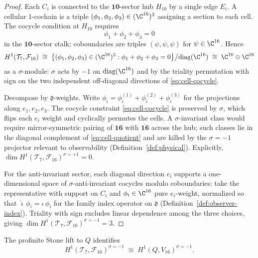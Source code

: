 \begin{proof}
Each $C_i$ is connected to the $\mathbf{10}$-sector hub $H_{10}$ by a single
edge $E_i$. A cellular $1$-cochain is a triple
$(\phi_1,\phi_2,\phi_3)\in(\C^{16})^3$ assigning a section to each cell. The
cocycle condition at $H_{10}$ requires
\begin{equation}\label{eq:cell-cocycle}
  \phi_1+\phi_2+\phi_3=0
\end{equation}
in the $\mathbf{10}$-sector stalk; coboundaries are triples
$(\psi,\psi,\psi)$ for $\psi\in\C^{16}$. Hence
\begin{equation}\label{eq:cell-quotient}
  H^1(\mathcal{T}_7,\mathcal{F}_{16})
  \;\cong\;
  \bigl\{(\phi_1,\phi_2,\phi_3)\in(\C^{16})^3:\phi_1+\phi_2+\phi_3=0\bigr\}
  \big/\mathrm{diag}(\C^{16})
  \;\cong\;
  \C^{16}\oplus\C^{16}
\end{equation}
as a $\sigma$-module: $\sigma$ acts by $-1$ on $\mathrm{diag}(\C^{16})$ and
by the triality permutation with sign on the two independent off-diagonal
directions of \eqref{eq:cell-cocycle}.

Decompose by $\mathfrak{d}$-weights. Write
$\phi_i=\phi_i^{(1)}+\phi_i^{(2)}+\phi_i^{(3)}$ for the projections along
$e_1,e_2,e_3$. The cocycle constraint \eqref{eq:cell-cocycle} is preserved by
$\sigma$, which flips each $e_i$ weight and cyclically permutes the cells.
A $\sigma$-invariant class would require mirror-symmetric pairing of
$\mathbf{16}$ with $\overline{\mathbf{16}}$ across the hub; such classes lie in
the diagonal complement of \eqref{eq:cell-quotient} and are killed by the
$\sigma=-1$ projector relevant to observability
(Definition~\ref{def:physical}). Explicitly,
$\dim H^1(\mathcal{T}_7,\mathcal{F}_{16})^{\sigma=+1}=0$.

For the anti-invariant sector, each diagonal direction $e_i$ supports a
one-dimensional space of $\sigma$-anti-invariant cocycles modulo
coboundaries: take the representative with support on $C_i$ and
$\phi_i\in\C^{16}$ pure $e_i$-weight, normalized so that
$\hat{\imath}\,\phi_i=\iota\,\phi_i$ for the family index operator on
$\mathfrak{d}$ (Definition~\ref{def:observer-index}). Triality with sign
excludes linear dependence among the three choices, giving
$\dim H^1(\mathcal{T}_7,\mathcal{F}_{16})^{\sigma=-1}=3$.
\end{proof}

\begin{proposition}\label{prop:stone-lift}
The profinite Stone lift to $Q$ identifies
\begin{equation}\label{eq:stone-lift}
  H^1(\mathcal{T}_7,\mathcal{F}_{16})^{\sigma=-1}
  \;\cong\;
  H^1(Q,V_{16})^{\sigma=-1}.
\end{equation}
\end{proposition}

